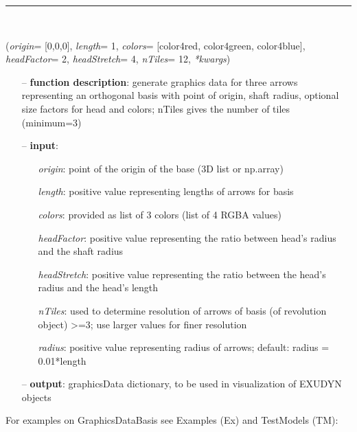 \begin{itemize}[leftmargin=1.4cm]
\begin{itemize}[leftmargin=1.4cm]
\begin{itemize}[leftmargin=0.5cm]
\begin{itemize}[leftmargin=1.4cm]
\begin{itemize}[leftmargin=1.4cm]
\begin{itemize}[leftmargin=0.5cm]
\begin{itemize}[leftmargin=1.4cm]
\begin{itemize}[leftmargin=0.5cm]
%
\noindent\rule{8cm}{0.75pt}\vspace{1pt} \\ 
\begin{flushleft}
\label{sec:graphicsDataUtilities:GraphicsDataBasis}
({\it origin}= [0,0,0], {\it length}= 1, {\it colors}= [color4red, color4green, color4blue], {\it headFactor}= 2, {\it headStretch}= 4, {\it nTiles}= 12, {\it **kwargs})
\end{flushleft}
\setlength{\itemindent}{0.7cm}
\begin{itemize}[leftmargin=0.7cm]
  \item[--]  {\bf function description}: generate graphics data for three arrows representing an orthogonal basis with point of origin, shaft radius, optional size factors for head and colors; nTiles gives the number of tiles (minimum=3)  \item[--]  {\bf input}: \vspace{-6pt}
  \begin{itemize}[leftmargin=1.2cm]
\setlength{\itemindent}{-0.7cm}
    \item[] {\it origin}: point of the origin of the base (3D list or np.array)
    \item[] {\it   length}: positive value representing lengths of arrows for basis
    \item[] {\it   colors}: provided as list of 3 colors (list of 4 RGBA values)
    \item[] {\it   headFactor}: positive value representing the ratio between head's radius and the shaft radius
    \item[] {\it   headStretch}: positive value representing the ratio between the head's radius and the head's length
    \item[] {\it   nTiles}: used to determine resolution of arrows of basis (of revolution object) >=3; use larger values for finer resolution
    \item[] {\it   radius}: positive value representing radius of arrows; default: radius = 0.01*length
  \end{itemize}
  \item[--]  {\bf output}: graphicsData dictionary, to be used in visualization of EXUDYN objects\vspace{12pt}\end{itemize}
%
%
\noindent For examples on GraphicsDataBasis see Examples (Ex) and TestModels (TM):

\end{itemize}
\end{itemize}
\end{itemize}
\end{itemize}
\end{itemize}
\end{itemize}
\end{itemize}
\end{itemize}
